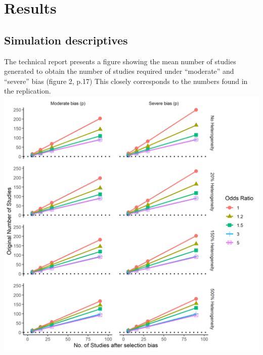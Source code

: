 \documentclass[
  english,
  doc,floatsintext,draftall]{apa6}
\begin{document}
\hypertarget{results}{%
\section{Results}\label{results}}

\hypertarget{simulation-descriptives}{%
\subsection{Simulation descriptives}\label{simulation-descriptives}}

The technical report presents a figure showing the mean number of studies generated to obtain the number of studies required under \enquote{moderate} and \enquote{severe} bias (figure 2, p.17)
This closely corresponds to the numbers found in the replication.
\includegraphics{../figures/studies_generated.png}
\end{document}
